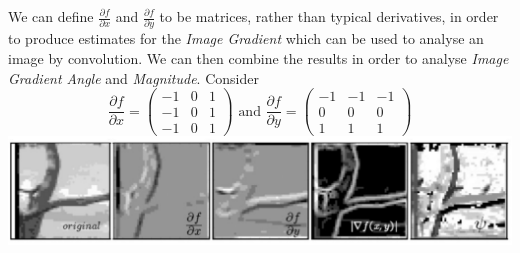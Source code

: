 \documentclass[11pt,a4paper]{article}
\begin{document}
We can define $\frac{\partial f}{\partial x}$ and $\frac{\partial f}{\partial y}$ to be matrices, rather than typical derivatives, in order to produce estimates for the \textit{Image Gradient} which can be used to analyse an image by convolution. We can then combine the results in order to analyse \textit{Image Gradient Angle} and \textit{Magnitude}. Consider
$$\dfrac{\partial f}{\partial x}=\begin{pmatrix}-1&0&1\\-1&0&1\\-1&0&1\end{pmatrix}\text{ and }\dfrac{\partial f}{\partial y}=\begin{pmatrix}-1&-1&-1\\0&0&0\\1&1&1\end{pmatrix}$$
\includegraphics[scale=.5]{img/gradientExtractionByFiltering.png}
\end{document}
